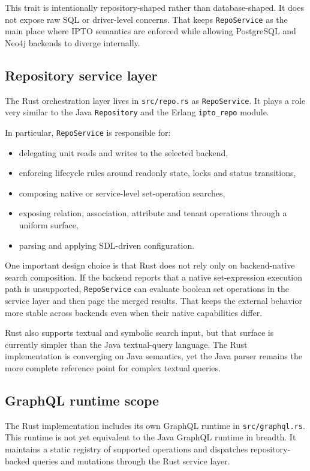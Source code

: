 This trait is intentionally repository-shaped rather than database-shaped. It does not expose raw SQL or driver-level concerns. That keeps \texttt{RepoService} as the main place where IPTO semantics are enforced while allowing PostgreSQL and Neo4j backends to diverge internally.

\subsection{Repository service layer}

The Rust orchestration layer lives in \texttt{src/repo.rs} as \texttt{RepoService}. It plays a role very similar to the Java \texttt{Repository} and the Erlang \texttt{ipto\_repo} module.

In particular, \texttt{RepoService} is responsible for:
\begin{itemize}
\item delegating unit reads and writes to the selected backend,
\item enforcing lifecycle rules around readonly state, locks and status transitions,
\item composing native or service-level set-operation searches,
\item exposing relation, association, attribute and tenant operations through a uniform surface,
\item parsing and applying SDL-driven configuration.
\end{itemize}

One important design choice is that Rust does not rely only on backend-native search composition. If the backend reports that a native set-expression execution path is unsupported, \texttt{RepoService} can evaluate boolean set operations in the service layer and then page the merged results. That keeps the external behavior more stable across backends even when their native capabilities differ.

Rust also supports textual and symbolic search input, but that surface is currently simpler than the Java textual-query language. The Rust implementation is converging on Java semantics, yet the Java parser remains the more complete reference point for complex textual queries.

\subsection{GraphQL runtime scope}

The Rust implementation includes its own GraphQL runtime in \texttt{src/graphql.rs}. This runtime is not yet equivalent to the Java GraphQL runtime in breadth. It maintains a static registry of supported operations and dispatches repository-backed queries and mutations through the Rust service layer.

